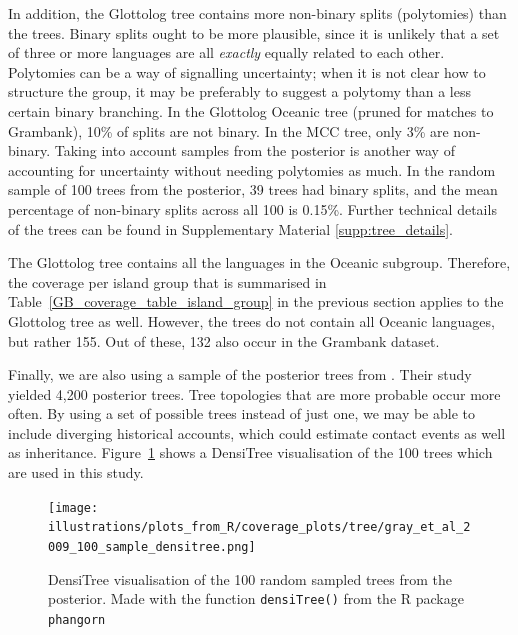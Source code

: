 \documentclass[12pt,letterpaper]{article}
\begin{document}
In addition, the Glottolog tree contains more non-binary splits (polytomies) than the \cite{grayetal_2009} trees. Binary splits ought to be more plausible, since it is unlikely that a set of three or more languages are all \textit{exactly} equally related to each other. Polytomies can be a way of signalling uncertainty; when it is not clear how to structure the group, it may be preferably to suggest a polytomy than a less certain binary branching. In the Glottolog Oceanic tree (pruned for matches to Grambank), 10\% of splits are not binary. In the \cite{grayetal_2009} MCC tree, only 3\% are non-binary. Taking into account samples from the posterior is another way of accounting for uncertainty without needing polytomies as much. In the random sample of 100 trees from the \cite{grayetal_2009} posterior, 39 trees had binary splits, and the mean percentage of non-binary splits across all 100 is 0.15\%. Further technical details of the trees can be found in Supplementary Material \ref{supp:tree_details}.

The Glottolog tree contains all the languages in the Oceanic subgroup. Therefore, the coverage per island group that is summarised in Table~\ref{GB_coverage_table_island_group} in the previous section applies to the Glottolog tree as well. However, the \cite{grayetal_2009} trees do not contain all Oceanic languages, but rather 155. Out of these, 132 also occur in the Grambank dataset. %

Finally, we are also using a sample of the posterior trees from \cite{grayetal_2009}. Their study yielded 4,200 posterior trees. Tree topologies that are more probable occur more often. By using a set of possible trees instead of just one, we may be able to include diverging historical accounts, which could estimate contact events as well as inheritance. Figure~\ref{densitree_plot} shows a DensiTree visualisation \citep{bouckaert2014densitree} of the 100 trees which are used in this study.

\begin{figure}[ht]
\centering
\texttt{[image: illustrations/plots\_from\_R/coverage\_plots/tree/gray\_et\_al\_2009\_100\_sample\_densitree.png]}
\caption{DensiTree \citep{bouckaert2014densitree} visualisation of the 100 random sampled trees from the \citet{grayetal_2009} posterior. Made with the function \texttt{densiTree()} from the R package \texttt{phangorn} \citep{phangorn}}
\label{densitree_plot}
\end{figure}
\end{document}
